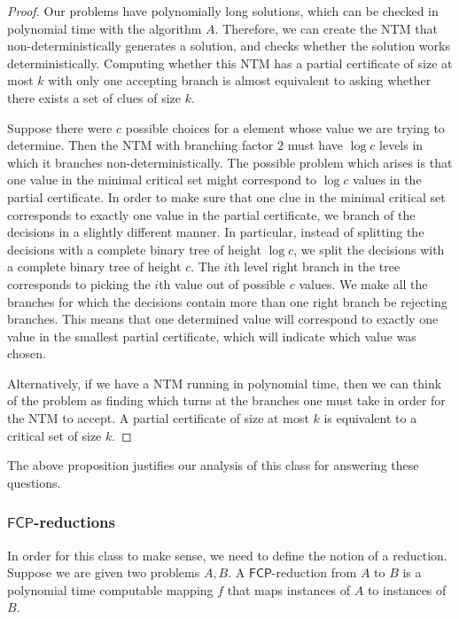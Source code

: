 \documentclass[runningheads,a4paper]{llncs}
\begin{document}
\begin{proof}
Our problems have polynomially long solutions, which can be checked in polynomial time with the algorithm $A$. Therefore, we can create the NTM that non-deterministically generates a solution, and checks whether the solution works deterministically. Computing whether this NTM has a partial certificate of size at most $k$ with only one accepting branch is almost equivalent to asking whether there exists a set of clues of size $k$. 

Suppose there were $c$ possible choices for a element whose value we are trying to determine. Then the NTM with branching factor $2$ must have $\log c$ levels in which it branches non-deterministically. The possible problem which arises is that one value in the minimal critical set might correspond to $\log c$ values in the partial certificate. In order to make sure that one clue in the minimal critical set corresponds to exactly one value in the partial certificate, we branch of the decisions in a slightly different manner. In particular, instead of splitting the decisions with a complete binary tree of height $\log c$, we split the decisions with a complete binary tree of height $c$. The $i$th level right branch in the tree corresponds to picking the $i$th value out of possible $c$ values. We make all the branches for which the decisions contain more than one right branch be rejecting branches. This means that one determined value will correspond to exactly one value in the smallest partial certificate, which will indicate which value was chosen.

Alternatively, if we have a NTM running in polynomial time, then we can think of the problem as finding which turns at the branches one must take in order for the NTM to accept. A partial certificate of size at most $k$ is equivalent to a critical set of size $k$.
\end{proof}

The above proposition justifies our analysis of this class for answering these questions.

\subsubsection{$\mathsf{FCP}$-reductions}

In order for this class to make sense, we need to define the notion of a reduction. Suppose we are given two problems $A, B$. A $\mathsf{FCP}$-reduction from $A$ to $B$ is a polynomial time computable mapping $f$ that maps instances of $A$ to instances of $B$.  
\end{document}

